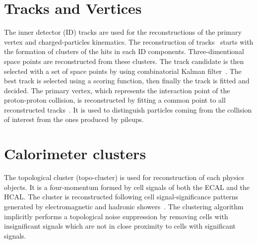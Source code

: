 \section{Tracks and Vertices}
The inner detector (ID) tracks are used for the reconstructions of the primary vertex and charged-particles kinematics.
The reconstruction of tracks~\cite{PERF-2015-08} starts with the formation of clusters of the hits in each ID components.
Three-dimentional space points are reconstructed from these clusters.
The track candidate is then selected with a set of space points by using combinatorial Kalman filter~\cite{FRUHWIRTH1987444}. 
The best track is selected using a scoring function, then finally the track is fitted and decided. 
The primary vertex, which represents the interaction point of the proton-proton collision, is reconstructed by fitting a common point to all reconstructed tracks~\cite{PERF-2015-01}. It is used to distinguish particles coming from the collision of interest from the ones produced by pileups.
\section{Calorimeter clusters} 
The topological cluster (topo-cluster) is used for reconstruction of each physics objects. It is a four-momentum formed by cell signals of both the ECAL and the HCAL.
The cluster is reconstructed following cell signal-significance patterns generated by electromagnetic and hadronic showers~\cite{PERF-2014-07}.
The clustering algorithm implicitly performs a topological noise suppression by removing cells with insignificant signals which are not in close proximity to cells with significant signals. 
